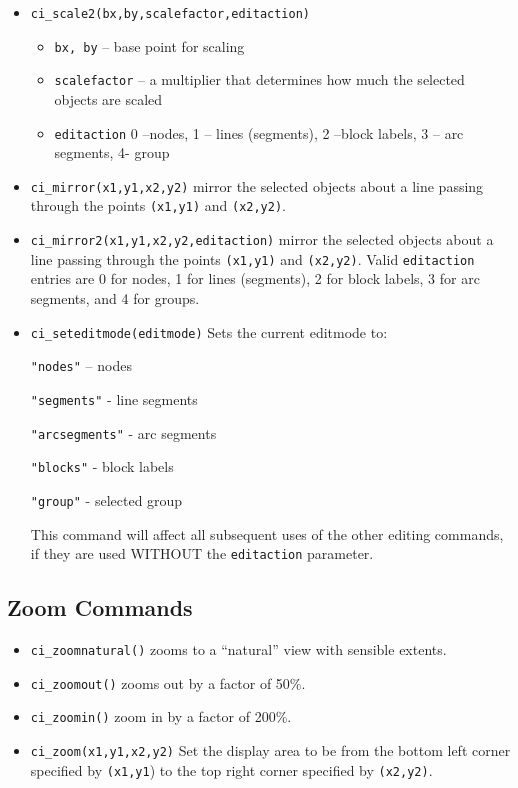 \begin{itemize}
\item{\tt ci\_scale2(bx,by,scalefactor,editaction)}
        \begin{itemize}
        \item{\tt bx, by} -- base point for scaling
        \item{\tt scalefactor} -- a multiplier that determines how
        much the selected objects are scaled
        \item{\tt editaction}  0 --nodes, 1 -- lines (segments), 2 --block labels, 3 -- arc
                segments, 4- group
        \end{itemize}

\item{\tt ci\_mirror(x1,y1,x2,y2)}
mirror the selected objects about a line passing through the points
{\tt (x1,y1)} and {\tt (x2,y2)}.

\item{\tt ci\_mirror2(x1,y1,x2,y2,editaction)}
mirror the selected objects about a line passing through the points
{\tt (x1,y1)} and {\tt (x2,y2)}. Valid {\tt editaction} entries are
0 for nodes, 1 for lines (segments), 2 for block labels, 3 for arc
segments, and 4 for groups.


\item \texttt{ci\_seteditmode(editmode)} Sets the current editmode to:

\texttt{"nodes"} -- nodes

\texttt{"segments"} - line segments

\texttt{"arcsegments"} - arc segments

\texttt{"blocks"} - block labels

\texttt{"group"} - selected group

This command will affect all subsequent uses of the other editing
commands, if they are used WITHOUT the \texttt{editaction}
parameter.
\end{itemize}

\subsection{Zoom Commands}

\begin{itemize}
\item \texttt{ci\_zoomnatural()} zooms to a ``natural'' view with sensible extents.

\item \texttt{ci\_zoomout()} zooms out by a factor of 50{\%}.

\item \texttt{ci\_zoomin()} zoom in by a factor of 200{\%}.

\item \texttt{ci\_zoom(x1,y1,x2,y2)} Set the display area to be from the bottom left
corner specified by \texttt{(x1,y1}) to the top right corner
specified by \texttt{(x2,y2)}.
\end{itemize}

